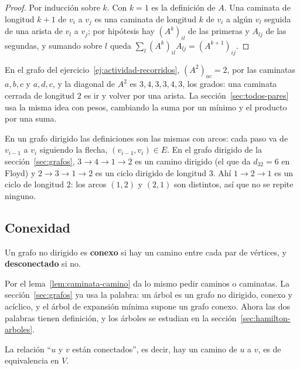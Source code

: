\documentclass[11pt,letterpaper]{article}
\begin{document}
\begin{proof}
  Por inducción sobre $k$. Con $k = 1$ es la definición de $A$. Una
  caminata de longitud $k + 1$ de $v_i$ a $v_j$ es una caminata de
  longitud $k$ de $v_i$ a algún $v_l$ seguida de una arista de $v_l$ a
  $v_j$; por hipótesis hay $(A^{k})_{il}$ de las primeras y $A_{lj}$
  de las segundas, y sumando sobre $l$ queda
  $\sum_{l} (A^{k})_{il} A_{lj} = (A^{k+1})_{ij}$.
\end{proof}

En el grafo del ejercicio~\ref{ej:actividad-recorridos},
$(A^{2})_{ac} = 2$, por las caminatas $a, b, c$ y $a, d, c$, y la
diagonal de $A^{2}$ es $3, 4, 3, 3, 4, 3$, los grados: una caminata
cerrada de longitud $2$ es ir y volver por una arista. La
sección~\ref{sec:todos-pares} usa la misma idea con pesos, cambiando
la suma por un mínimo y el producto por una suma.

En un grafo dirigido las definiciones son las mismas con arcos: cada
paso va de $v_{i-1}$ a $v_i$ siguiendo la flecha, $(v_{i-1}, v_i) \in
E$. En el grafo dirigido de la sección~\ref{sec:grafos},
$3 \to 4 \to 1 \to 2$ es un camino dirigido (el que da $d_{32} = 6$
en Floyd) y $2 \to 3 \to 1 \to 2$ es un ciclo dirigido de longitud
$3$. Ahí $1 \to 2 \to 1$ es un ciclo de longitud $2$: los arcos
$(1, 2)$ y $(2, 1)$ son distintos, así que no se repite ninguno.


\subsection*{Conexidad}

\begin{definicion}[Conexo]
  \label{def:conexo}
  Un grafo no dirigido es \textbf{conexo} si hay un camino entre cada
  par de vértices, y \textbf{desconectado} si no.
\end{definicion}

Por el lema~\ref{lem:caminata-camino} da lo mismo pedir caminos o
caminatas. La sección~\ref{sec:grafos} ya usa la palabra: un árbol es
un grafo no dirigido, conexo y acíclico, y el árbol de expansión
mínima supone un grafo conexo. Ahora las dos palabras tienen
definición, y los árboles se estudian en la
sección~\ref{sec:hamilton-arboles}.

\begin{proposicion}
  \label{prop:conectados-equivalencia}
  La relación ``$u$ y $v$ están conectados'', es decir, hay un camino
  de $u$ a $v$, es de equivalencia en $V$.
\end{proposicion}
\end{document}
